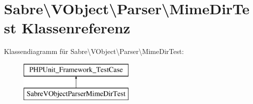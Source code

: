 \hypertarget{class_sabre_1_1_v_object_1_1_parser_1_1_mime_dir_test}{}\section{Sabre\textbackslash{}V\+Object\textbackslash{}Parser\textbackslash{}Mime\+Dir\+Test Klassenreferenz}
\label{class_sabre_1_1_v_object_1_1_parser_1_1_mime_dir_test}
Klassendiagramm für Sabre\textbackslash{}V\+Object\textbackslash{}Parser\textbackslash{}Mime\+Dir\+Test\+:\begin{figure}[H]
\begin{center}
\leavevmode
\includegraphics[height=2.000000cm]{class_sabre_1_1_v_object_1_1_parser_1_1_mime_dir_test}
\end{center}
\end{figure}

